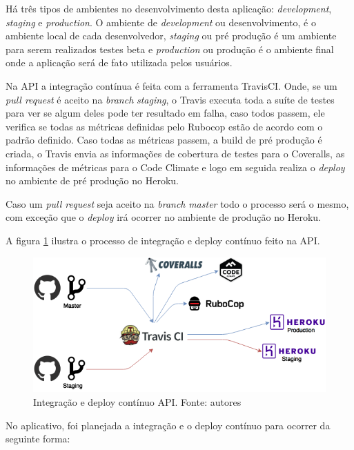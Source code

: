 Há três tipos de ambientes no desenvolvimento desta aplicação: \textit{development}, \textit{staging} e \textit{production}. O ambiente de \textit{development} ou desenvolvimento, é o ambiente local de cada desenvolvedor, \textit{staging} ou pré produção é um ambiente para serem realizados testes beta e \textit{production} ou produção é o ambiente final onde a aplicação será de fato utilizada pelos usuários.

Na API a integração contínua é feita com a ferramenta TravisCI. Onde, se um \textit{pull request} é aceito na \textit{branch} \textit{staging}, o Travis executa toda a suíte de testes para ver se algum deles pode ter resultado em falha, caso todos passem, ele verifica se todas as métricas definidas pelo Rubocop estão de acordo com o padrão definido. Caso todas as métricas passem, a build de pré produção é criada, o Travis envia as informações de cobertura de testes para o Coveralls, as informações de métricas para o Code Climate e logo em seguida realiza o \textit{deploy} no ambiente de pré produção no Heroku.

Caso um \textit{pull request} seja aceito na \textit{branch} \textit{master} todo o processo será o mesmo, com exceção que o \textit{deploy} irá ocorrer no ambiente de produção no Heroku.

A figura \ref{img:integracao_deploy_continuo_api} ilustra o processo de integração e deploy contínuo feito na API.

\begin{figure}[H]
    \centering
    \includegraphics[scale=0.5]{figuras/api_ci.png}
    \caption[Integração e deploy contínuo API]{Integração e deploy contínuo API. Fonte: autores}
    \label{img:integracao_deploy_continuo_api}
\end{figure}

No aplicativo, foi planejada a integração e o deploy contínuo para ocorrer da seguinte forma:

